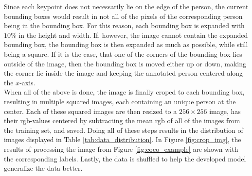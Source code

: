\documentclass[./main.tex]{subfiles}
\begin{document}
Since each keypoint does not necessarily lie on the edge of the person, the current bounding boxes would result in not all of the pixels of the corresponding person being in the bounding box. For this reason, each bounding box is expanded with $10\%$ in the height and width. If, however, the image cannot contain the expanded bounding box, the bounding box is then expanded as much as possible, while still being a square. If it is the case, that one of the corners of the bounding box lies outside of the image, then the bounding box is moved either up or down, making the corner lie inside the image and keeping the annotated person centered along the $x$-axis. \\
When all of the above is done, the image is finally croped to each bounding box, resulting in multiple squared images, each containing an unique person at the center. Each of these squared images are then resized to a $256 \times 256$ image, has their rgb-values centered by subtracting the mean rgb of all of the images from the training set, and saved. Doing all of these steps results in the distribution of images displayed in Table \ref{tab:data_distribution}. In Figure \ref{fig:crop_img}, the results of processing the image from Figure \ref{fig:coco_example} are shown with the corresponding labels. Lastly, the data is shuffled to help the developed model generalize the data better.
\end{document}
